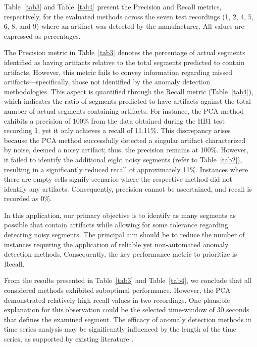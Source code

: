 \documentclass[conference]{IEEEtran}
\begin{document}



Table~\ref{tab3} and Table~\ref{tab4} present the Precision and Recall metrics, respectively, for the evaluated methods across the seven test recordings (1, 2, 4, 5, 6, 8, and 9) where an artifact was detected by the manufacturer. All values are expressed as percentages.

The Precision metric in Table~\ref{tab3} denotes the percentage of
actual segments identified as having artifacts relative to the total
segments predicted to contain artifacts. However, this metric fails to
convey information regarding missed artifacts---specifically, those not
identified by the anomaly detection methodologies. This aspect is
quantified through the Recall metric (Table~\ref{tab4}), which
indicates the ratio of segments predicted to have artifacts against
the total number of actual segments containing artifacts. For
instance, the PCA method exhibits a precision of 100\% from the data
obtained during the HB1 test recording 1, yet it only achieves a
recall of 11.11\%. This discrepancy arises because the PCA method
successfully detected a singular artifact characterized by noise,
deemed a noisy artifact; thus, the precision remains at
100\%. However, it failed to identify the additional eight noisy
segments (refer to Table~\ref{tab2}), resulting in a significantly
reduced recall of approximately 11\%. Instances where there are empty
cells signify scenarios where the respective method did not identify
any artifacts. Consequently, precision cannot be ascertained, and
recall is recorded as 0\%.

In this application, our primary objective is to identify as many segments as possible that contain artifacts while allowing for some tolerance regarding detecting noisy segments. The principal aim should be to reduce the number of instances requiring the application of reliable yet non-automated anomaly detection methods. Consequently, the key performance metric to prioritize is Recall.

From the results presented in Table~\ref{tab3} and Table~\ref{tab4}, we conclude that all considered methods exhibited suboptimal performance. However, the PCA demonstrated relatively high recall values in two recordings. One plausible explanation for this observation could be the selected time-window of 30 seconds that defines the examined segment. The efficacy of anomaly detection methods in time series analysis may be significantly influenced by the length of the time series, as supported by existing literature \cite{Lee_2021}.
\end{document}
